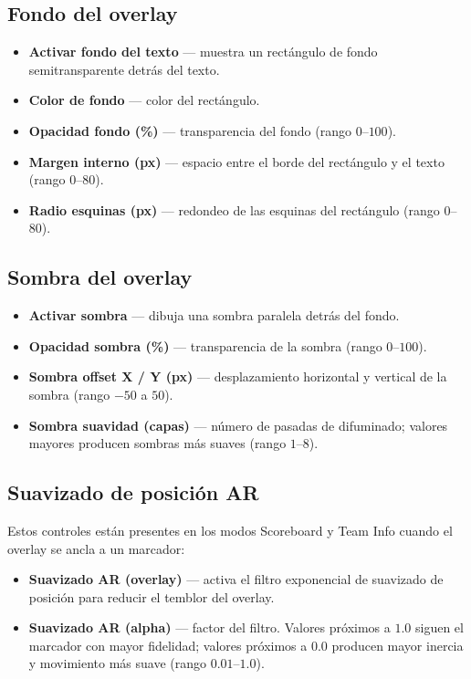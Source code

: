 \subsection*{Fondo del overlay}

\begin{itemize}
  \item \textbf{Activar fondo del texto} — muestra un rectángulo de fondo semitransparente detrás del texto.
  \item \textbf{Color de fondo} — color del rectángulo.
  \item \textbf{Opacidad fondo (\%)} — transparencia del fondo (rango $0$--$100$).
  \item \textbf{Margen interno (px)} — espacio entre el borde del rectángulo y el texto (rango $0$--$80$).
  \item \textbf{Radio esquinas (px)} — redondeo de las esquinas del rectángulo (rango $0$--$80$).
\end{itemize}

\subsection*{Sombra del overlay}

\begin{itemize}
  \item \textbf{Activar sombra} — dibuja una sombra paralela detrás del fondo.
  \item \textbf{Opacidad sombra (\%)} — transparencia de la sombra (rango $0$--$100$).
  \item \textbf{Sombra offset X / Y (px)} — desplazamiento horizontal y vertical de la sombra (rango $-50$ a $50$).
  \item \textbf{Sombra suavidad (capas)} — número de pasadas de difuminado; valores mayores producen sombras más suaves (rango $1$--$8$).
\end{itemize}

\subsection*{Suavizado de posición AR}

Estos controles están presentes en los modos Scoreboard y Team Info cuando el overlay se ancla a un marcador:

\begin{itemize}
  \item \textbf{Suavizado AR (overlay)} — activa el filtro exponencial de suavizado de posición para reducir el temblor del overlay.
  \item \textbf{Suavizado AR (alpha)} — factor del filtro. Valores próximos a $1.0$ siguen el marcador con mayor fidelidad; valores próximos a $0.0$ producen mayor inercia y movimiento más suave (rango $0.01$--$1.0$).
\end{itemize}

